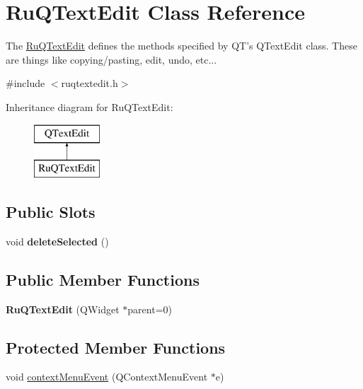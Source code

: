 \hypertarget{class_ru_q_text_edit}{}\section{Ru\+Q\+Text\+Edit Class Reference}
\label{class_ru_q_text_edit}


The \hyperlink{class_ru_q_text_edit}{Ru\+Q\+Text\+Edit} defines the methods specified by Q\+T's Q\+Text\+Edit class. These are things like copying/pasting, edit, undo, etc...  




{\ttfamily \#include $<$ruqtextedit.\+h$>$}

Inheritance diagram for Ru\+Q\+Text\+Edit\+:\begin{figure}[H]
\begin{center}
\leavevmode
\includegraphics[height=2.000000cm]{class_ru_q_text_edit}
\end{center}
\end{figure}
\subsection*{Public Slots}
\begin{DoxyCompactItemize}
\item 
\hypertarget{class_ru_q_text_edit_a77cd67f6d9eebf4054c96d213872f97f}{}void {\bfseries delete\+Selected} ()\label{class_ru_q_text_edit_a77cd67f6d9eebf4054c96d213872f97f}

\end{DoxyCompactItemize}
\subsection*{Public Member Functions}
\begin{DoxyCompactItemize}
\item 
\hypertarget{class_ru_q_text_edit_a856a9951b1d7b989c5150f9dc2a387d3}{}{\bfseries Ru\+Q\+Text\+Edit} (Q\+Widget $\ast$parent=0)\label{class_ru_q_text_edit_a856a9951b1d7b989c5150f9dc2a387d3}

\end{DoxyCompactItemize}
\subsection*{Protected Member Functions}
\begin{DoxyCompactItemize}
\item 
void \hyperlink{class_ru_q_text_edit_a8fc9c19a6eed33f89d0d62d23ec57ca9}{context\+Menu\+Event} (Q\+Context\+Menu\+Event $\ast$e)
\end{DoxyCompactItemize}

